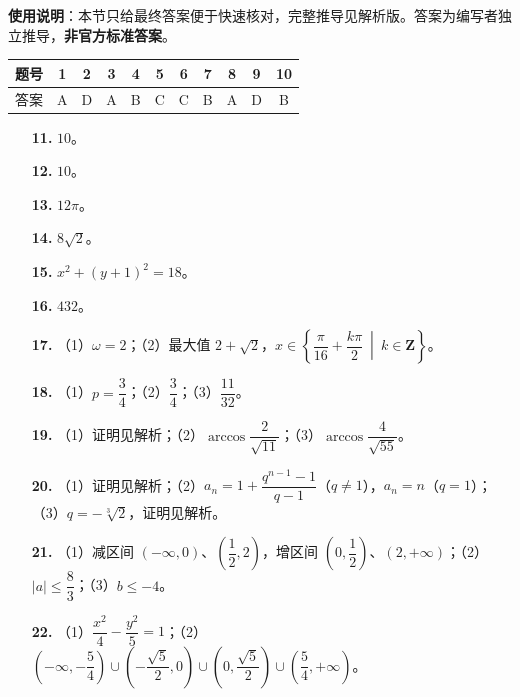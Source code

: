 
\begin{gknotice}
\textbf{使用说明}：本节只给最终答案便于快速核对，完整推导见解析版。答案为编写者独立推导，\textbf{非官方标准答案}。
\end{gknotice}

\begin{center}\begin{tabular}{ccccccccccc}
\toprule
题号 & 1 & 2 & 3 & 4 & 5 & 6 & 7 & 8 & 9 & 10 \\
\midrule
答案 & A & D & A & B & C & C & B & A & D & B \\
\bottomrule
\end{tabular}\end{center}

\begin{itemize}[leftmargin=2.6em]
  \item[\textbf{11.}] $10$。
  \item[\textbf{12.}] $10$。
  \item[\textbf{13.}] $12\pi$。
  \item[\textbf{14.}] $8\sqrt2$。
  \item[\textbf{15.}] $x^2+(y+1)^2=18$。
  \item[\textbf{16.}] $432$。
\end{itemize}

\begin{itemize}[leftmargin=2.6em]
  \item[\textbf{17.}] （1）$\omega=2$；（2）最大值 $2+\sqrt2$，$x\in\left\{\dfrac{\pi}{16}+\dfrac{k\pi}2\ \middle|\ k\in\mathbf Z\right\}$。
  \item[\textbf{18.}] （1）$p=\dfrac34$；（2）$\dfrac34$；（3）$\dfrac{11}{32}$。
  \item[\textbf{19.}] （1）证明见解析；（2）$\arccos\dfrac2{\sqrt{11}}$；（3）$\arccos\dfrac4{\sqrt{55}}$。
  \item[\textbf{20.}] （1）证明见解析；（2）$a_n=1+\dfrac{q^{n-1}-1}{q-1}$（$q\neq1$），$a_n=n$（$q=1$）；（3）$q=-\sqrt[3]{2}$，证明见解析。
  \item[\textbf{21.}] （1）减区间 $(-\infty,0)$、$\left(\dfrac12,2\right)$，增区间 $\left(0,\dfrac12\right)$、$(2,+\infty)$；（2）$|a|\leqslant\dfrac83$；（3）$b\leqslant-4$。
  \item[\textbf{22.}] （1）$\dfrac{x^2}4-\dfrac{y^2}5=1$；（2）$\left(-\infty,-\dfrac54\right)\cup\left(-\dfrac{\sqrt5}2,0\right)\cup\left(0,\dfrac{\sqrt5}2\right)\cup\left(\dfrac54,+\infty\right)$。
\end{itemize}
